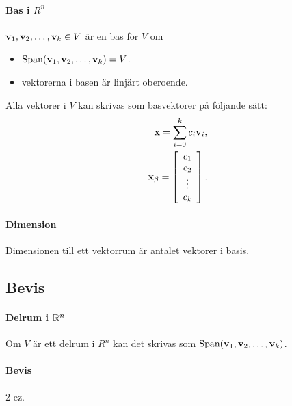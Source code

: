 \paragraph{Bas i $R^n$}
$\vect{v}_1, \vect{v}_2, \dots, \vect{v}_k\in V$ är en bas för $V$ om
\begin{itemize}
	\item $\Span(\vect{v}_1, \vect{v}_2, \dots, \vect{v}_k) = V$.
	\item vektorerna i basen är linjärt oberoende.
\end{itemize}
Alla vektorer i $V$ kan skrivas som basvektorer på följande sätt:
\begin{align*}
	\vect{x} = \sum\limits_{i = 0}^{k}c_i\vect{v}_i, \\
	\vect{x}_\beta =
	\left[\begin{array}{c}
		c_1 \\
		c_2 \\
		\vdots \\
		c_k
	\end{array}\right].
\end{align*}

\paragraph{Dimension}
Dimensionen till ett vektorrum är antalet vektorer i basis.

\subsection{Bevis}

\paragraph{Delrum i $\mathbb{R}^n$}
Om $V$ är ett delrum i $R^n$ kan det skrivas som $\Span(\vect{v}_1, \vect{v}_2, \dots, \vect{v}_k)$.

\paragraph{Bevis}
2 ez.